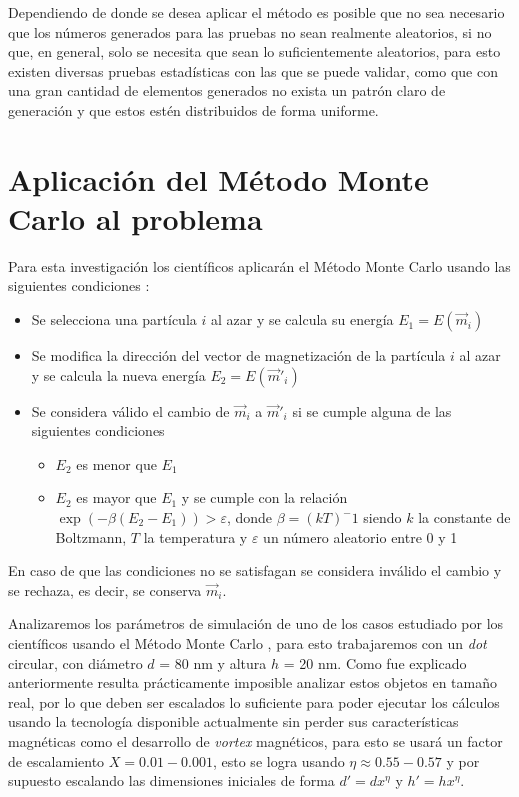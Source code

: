 Dependiendo de donde se desea aplicar el método es posible que no sea necesario que los números generados para las pruebas no sean realmente aleatorios, si no que, en general, solo se necesita que sean lo suficientemente aleatorios, para esto existen diversas pruebas estadísticas con las que se puede validar, como que con una gran cantidad de elementos generados no exista un patrón claro de generación y que estos estén distribuidos de forma uniforme.

\section{Aplicación del Método Monte Carlo al problema}

Para esta investigación los científicos aplicarán el Método Monte Carlo usando las siguientes condiciones \citep{TesisAllende}:

\begin{itemize}
 \item Se selecciona una partícula $i$ al azar y se calcula su energía $E_1 = E(\vec{m}_i)$
 \item Se modifica la dirección del vector de magnetización de la partícula $i$ al azar y se calcula la nueva energía $E_2 = E(\vec{m}'_i)$
 \item Se considera válido el cambio de $\vec{m}_i$ a $\vec{m}'_i$ si se cumple alguna de las siguientes condiciones
 \begin{itemize}
  \item $E_2$ es menor que $E_1$
  \item $E_2$ es mayor que $E_1$ y se cumple con la relación $\exp(-\beta(E_2 - E_1)) > \varepsilon$, donde $\beta = (kT)^-1$ siendo $k$ la constante de Boltzmann, $T$ la temperatura \citep{newmanb99} y $\varepsilon$ un número aleatorio entre 0 y 1
 \end{itemize}
\end{itemize}

En caso de que las condiciones no se satisfagan se considera inválido el cambio y se rechaza, es decir, se conserva $\vec{m}_i$.

Analizaremos los parámetros de simulación de uno de los casos estudiado por los científicos usando el Método Monte Carlo \citep{asymmetricMagneticDots}, para esto trabajaremos con un \emph{dot} circular, con diámetro $d$ = 80 nm y altura $h$ = 20 nm. Como fue explicado anteriormente resulta prácticamente imposible analizar estos objetos en tamaño real, por lo que deben ser escalados lo suficiente para poder ejecutar los cálculos usando la tecnología disponible actualmente sin perder sus características magnéticas como el desarrollo de \emph{vortex} magnéticos, para esto se usará un factor de escalamiento $X = 0.01 - 0.001$, esto se logra usando $\eta \approx 0.55 - 0.57$ y por supuesto escalando las dimensiones iniciales de forma $d' = dx^\eta$ y $h' = hx^\eta$.

